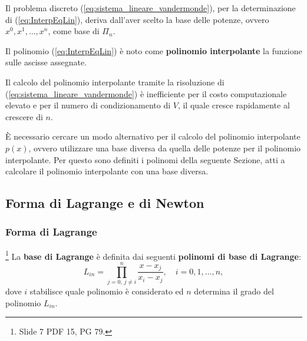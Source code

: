 Il problema discreto (\ref{eq:sistema_lineare_vandermonde}), per la determinazione di (\ref{eq:InterpEqLin}), deriva dall'aver scelto la base delle potenze, ovvero ${x^0,x^1,\hdots, x^n}$, come base di $\Pi_n$.

\begin{definition}
    Il polinomio (\ref{eq:InterpEqLin}) è noto come \textbf{polinomio interpolante} la funzione sulle ascisse assegnate.
\end{definition}

Il calcolo del polinomio interpolante tramite la risoluzione di (\ref{eq:sistema_lineare_vandermonde}) è inefficiente per il costo computazionale elevato e per il numero di condizionamento di $V$, il quale cresce rapidamente al crescere di $n$.

È necessario cercare un modo alternativo per il calcolo del polinomio interpolante $p(x)$, ovvero utilizzare una base diversa da quella delle potenze per il polinomio interpolante. Per questo sono definiti i polinomi della seguente Sezione, atti a calcolare il polinomio interpolante con una base diversa.

\subsection{Forma di Lagrange e di Newton}

\subsubsection{Forma di Lagrange}

\begin{definition}\footnote{Slide 7 PDF 15, PG 79.}
    La \textbf{base di Lagrange} è definita dai seguenti \textbf{polinomi di base di Lagrange}:
    \begin{equation}\label{eq:polLagrange}
        L_{in}=\prod_{j=0,\,j\neq i}^{n} \frac{x-x_j}{x_i-x_j},\quad i=0,1,\hdots,n, 
    \end{equation}
    dove $i$ stabilisce quale polinomio è considerato ed $n$ determina il grado del polinomio $L_{in}$.
\end{definition}

